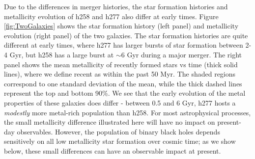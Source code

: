 \documentclass[nofootinbib,twocolumn,prd]{emulateapj}
\begin{document}
  Due to the differences in merger histories, the star formation histories and metallicity
  evolution of h258 and h277 also differ at early times.  Figure
  \ref{fig:TwoGalaxies} shows the star formation history (left panel) and metallicity evolution (right panel) of the two galaxies.  The star formation histories are quite different at early times, where h277 has larger bursts of star formation between 2-4 Gyr, but h258 has a large burst at $\sim 6$ Gyr during a major merger.   The right panel shows the mean metallicity of
  recently formed stars vs time (thick solid lines), where we define
  recent as within the past 50 Myr.  The shaded regions correspond to
  one standard deviation of the mean, while the thick dashed lines
  represent the top and bottom 90\%.  We see that the early evolution
  of the metal properties of these galaxies does differ - between 0.5
  and 6 Gyr, h277 hosts a \emph{modestly}  more metal-rich population than
  h258.   For most astrophysical processes, the small metallicity difference illustrated here will have no impact on
  present-day observables.  However,  the population of binary black holes  depends sensitively on all low metallicity star formation
  over cosmic time; as we show below, these small differences can have an observable impact at present.   
\end{document}
